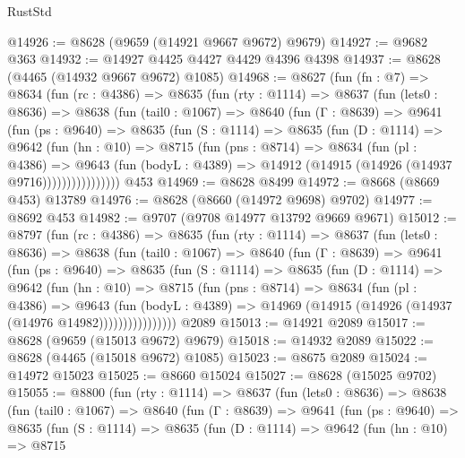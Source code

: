 \begin{lexlean}{RustStd}
\begin{coremodule}
@14926 := @8628 (@9659 (@14921 @9667 @9672) @9679)
@14927 := @9682 @363
@14932 := @14927 @4425 @4427 @4429 @4396 @4398
@14937 := @8628 (@4465 (@14932 @9667 @9672) @1085)
@14968 := @8627
    (fun (fn : @7) =>
    @8634
      (fun (rc : @4386) =>
      @8635
        (fun (rty : @1114) =>
        @8637
          (fun (lets0 : @8636) =>
          @8638
            (fun (tail0 : @1067) =>
            @8640
              (fun (Γ : @8639) =>
              @9641
                (fun (ps : @9640) =>
                @8635
                  (fun (S : @1114) =>
                  @8635
                    (fun (D : @1114) =>
                    @9642
                      (fun (hn : @10) =>
                      @8715
                        (fun (pns : @8714) =>
                        @8634
                          (fun (pl : @4386) =>
                          @9643
                            (fun (bodyL : @4389) =>
                            @14912 (@14915 (@14926 (@14937 @9716))))))))))))))))
    @453
@14969 := @8628 @8499
@14972 := @8668 (@8669 @453) @13789
@14976 := @8628 (@8660 (@14972 @9698) @9702)
@14977 := @8692 @453
@14982 := @9707 (@9708 @14977 @13792 @9669 @9671)
@15012 := @8797
    (fun (rc : @4386) =>
    @8635
      (fun (rty : @1114) =>
      @8637
        (fun (lets0 : @8636) =>
        @8638
          (fun (tail0 : @1067) =>
          @8640
            (fun (Γ : @8639) =>
            @9641
              (fun (ps : @9640) =>
              @8635
                (fun (S : @1114) =>
                @8635
                  (fun (D : @1114) =>
                  @9642
                    (fun (hn : @10) =>
                    @8715
                      (fun (pns : @8714) =>
                      @8634
                        (fun (pl : @4386) =>
                        @9643
                          (fun (bodyL : @4389) =>
                          @14969 (@14915 (@14926 (@14937 (@14976 @14982))))))))))))))))
    @2089
@15013 := @14921 @2089
@15017 := @8628 (@9659 (@15013 @9672) @9679)
@15018 := @14932 @2089
@15022 := @8628 (@4465 (@15018 @9672) @1085)
@15023 := @8675 @2089
@15024 := @14972 @15023
@15025 := @8660 @15024
@15027 := @8628 (@15025 @9702)
@15055 := @8800
    (fun (rty : @1114) =>
    @8637
      (fun (lets0 : @8636) =>
      @8638
        (fun (tail0 : @1067) =>
        @8640
          (fun (Γ : @8639) =>
          @9641
            (fun (ps : @9640) =>
            @8635
              (fun (S : @1114) =>
              @8635
                (fun (D : @1114) =>
                @9642
                  (fun (hn : @10) =>
                  @8715

\end{coremodule}
\end{lexlean}
